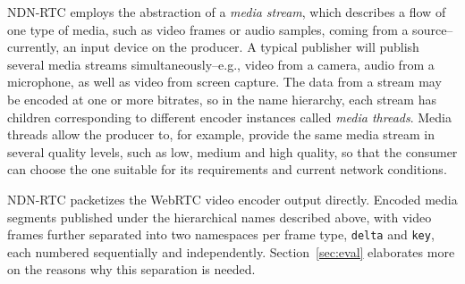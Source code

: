 \documentclass{icn/sig-alternate-2013} %
\newcommand{\ndnrtcName}{NDN-RTC} %
\begin{document}
\ndnrtcName{} employs the abstraction of a \textit{media stream}, which describes a flow of one type of media, such as video frames or audio samples, coming from a source--currently, an input device on the producer.
A typical publisher will publish several media streams simultaneously--e.g., video from a camera, audio from a microphone, as well as video from screen capture.  The data from a stream may be encoded at one or more bitrates, so in the name hierarchy, each stream has children corresponding to different encoder instances called \textit{media threads}. Media threads allow the producer to, for example, provide the same media stream in several quality levels, such as low, medium and high quality, so that the consumer can choose the one suitable for its requirements and current network conditions.

\ndnrtcName{} packetizes the WebRTC video encoder output directly. Encoded media segments published under the hierarchical names described above, with video frames further separated into two namespaces per frame type, \texttt{delta} and \texttt{key}, each numbered sequentially and independently. Section~\ref{sec:eval} elaborates more on the reasons why this separation is needed. 

\end{document}
